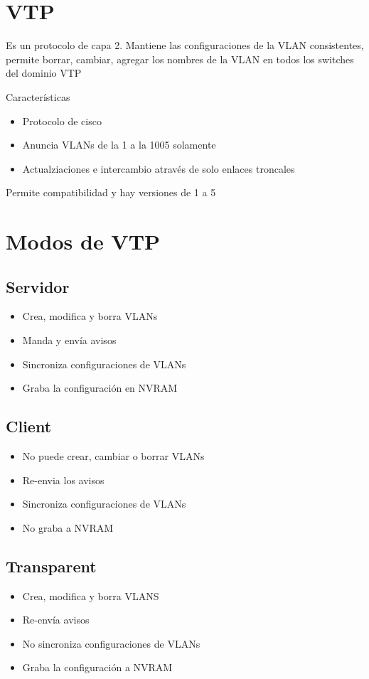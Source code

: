 \section{VTP}
Es un protocolo de capa 2. Mantiene las configuraciones de la VLAN consistentes, permite borrar, cambiar, agregar los nombres de la VLAN en todos los switches del dominio VTP\break

Características
\begin{itemize}
    \item Protocolo de cisco 
    \item Anuncia VLANs de la 1 a la 1005 solamente 
    \item Actualziaciones e intercambio através de solo enlaces troncales 
\end{itemize}

Permite compatibilidad y hay versiones de 1 a 5\break 

\section{Modos de VTP}
\subsection{Servidor}
\begin{itemize}
    \item Crea, modifica y borra VLANs
    \item Manda y envía avisos
    \item Sincroniza configuraciones de VLANs 
    \item Graba la configuración en NVRAM
\end{itemize}

\subsection{Client}
\begin{itemize}
    \item No puede crear, cambiar o borrar VLANs
    \item Re-envia los avisos 
    \item Sincroniza configuraciones de VLANs 
    \item No graba a NVRAM
\end{itemize}

\subsection{Transparent}
\begin{itemize}
    \item Crea, modifica y borra VLANS 
    \item Re-envía avisos 
    \item No sincroniza configuraciones de VLANs
    \item Graba la configuración a NVRAM
\end{itemize}

